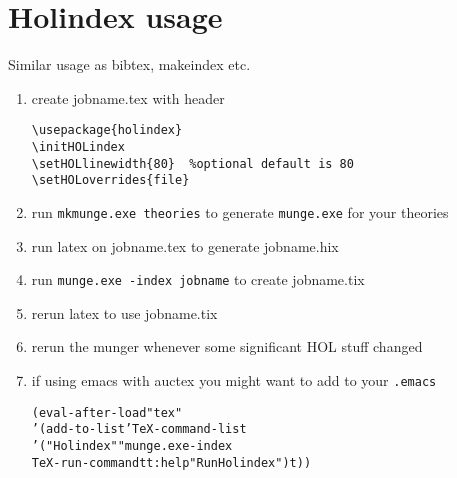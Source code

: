 \documentclass{article}
\begin{document}
\section{Holindex usage}

Similar usage as bibtex, makeindex etc.

\begin{enumerate}
\item create jobname.tex with header
\begin{verbatim}
\usepackage{holindex}
\initHOLindex
\setHOLlinewidth{80}  %optional default is 80
\setHOLoverrides{file}
\end{verbatim}
\item run \texttt{mkmunge.exe theories} to generate \texttt{munge.exe} for your theories
\item run latex on jobname.tex to generate jobname.hix
\item run \texttt{munge.exe -index jobname} to create jobname.tix
\item rerun latex to use jobname.tix
\item rerun the munger whenever some significant HOL stuff changed
\item if using emacs with auctex you might want to add to your \texttt{.emacs}
\begin{alltt}
(eval-after-load "tex"
  '(add-to-list 'TeX-command-list
    '("Holindex" "munge.exe -index %s" 
       TeX-run-command t t :help "Run Holindex") t))
\end{alltt}
\end{enumerate}
\end{document}
